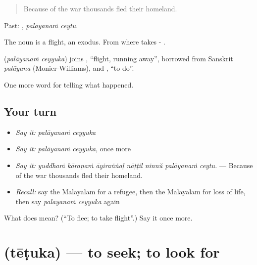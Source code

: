 \begin{quote}
Because of the war thousands fled their homeland.
\end{quote}

Past:  , \emph{palāyanaṁ ceytu}.

The noun  is a flight, an exodus. From where takes - .

\begin{cousinweb}
\textbf{ } (\emph{palāyanaṁ ceyyuka}) joins , \textquotedblleft{}flight, running away\textquotedblright{}, borrowed from Sanskrit \emph{palāyana} (Monier-Williams), and , \textquotedblleft{}to do\textquotedblright{}.
\end{cousinweb}

\begin{grammarlens}[title={What you've built}]
One more word for telling what happened.
\end{grammarlens}

\subsection*{Your turn}
\begin{itemize}
\raggedright
  \item \emph{Say it:} \emph{palāyanaṁ ceyyuka}
  \item \emph{Say it:} \emph{palāyanaṁ ceyyuka}, once more
  \item \emph{Say it:} \emph{yuddhaṁ kāraṇaṁ āyiraṅṅaḷ nāṭṭil ninnŭ palāyanaṁ ceytu.} — Because of the war thousands fled their homeland.
  \item \emph{Recall:} say the Malayalam for a refugee, then the Malayalam for loss of life, then say \emph{palāyanaṁ ceyyuka} again
\end{itemize}

\begin{tcolorbox}[breakable,colback=teal!4,colframe=teal!35!black,title={Before you move on}]
What does   mean? (\textquotedblleft{}To flee; to take flight\textquotedblright{}.) Say it once more.
\end{tcolorbox}
\section[\texorpdfstring{\ml{തേടുക} (tēṭuka)}{തേടുക (tēṭuka)}]{ (tēṭuka) — to seek; to look for}

\label{lesson:ML-C378-tetuka}



